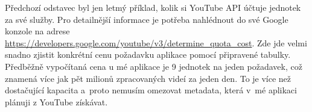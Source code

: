 \par Předchozí odstavec byl jen letmý příklad, kolik si YouTube API účtuje jednotek za své služby. Pro detailnější informace je potřeba nahlédnout do své Google konzole na adrese \url{https://developers.google.com/youtube/v3/determine_quota_cost}\cite{quota}. Zde jde velmi snadno zjistit konkrétní cenu požadavku aplikace pomocí připravené tabulky. Předběžně vypočítaná cena u mé aplikace je 9 jednotek na jeden požadavek, což znamená více jak pět milionů zpracovaných videí za jeden den. To je více než dostačující kapacita a~proto nemusím omezovat metadata, která v~mé aplikaci plánuji z YouTube získávat. 